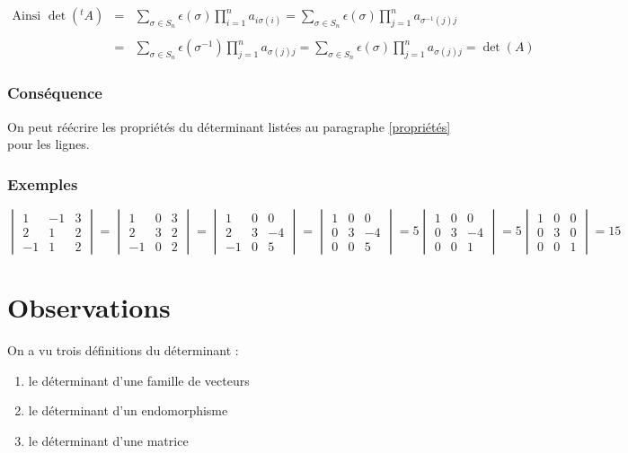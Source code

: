 \documentclass[a4paper,10pt]{book} %
\begin{document}
$\begin{array}{rcl}\text{Ainsi } \det({}^tA)&=& \sum_{\sigma\in S_n}\epsilon(\sigma)\prod_{i=1}^na_{i\sigma(i)}
=\sum_{\sigma\in S_n}\epsilon(\sigma)\prod_{j=1}^na_{\sigma^{-1}(j)j}\\\\
&=&\sum_{\sigma\in S_n}\epsilon(\sigma^{-1})\prod_{j=1}^na_{\sigma(j)j}
=\sum_{\sigma\in S_n}\epsilon(\sigma)\prod_{j=1}^na_{\sigma(j)j}=\det(A)\end{array}$

\subsubsection{Conséquence}
On peut réécrire les propriétés du déterminant listées au paragraphe \ref{propriétés} pour les lignes.

\subsubsection{Exemples}
$\begin{vmatrix}
1&-1&3\\2&1&2\\-1&1&2
\end{vmatrix}=\begin{vmatrix}
1&0&3\\2&3&2\\-1&0&2
\end{vmatrix}=\begin{vmatrix}
1&0&0\\2&3&-4\\-1&0&5
\end{vmatrix}=\begin{vmatrix}
1&0&0\\0&3&-4\\0&0&5
\end{vmatrix}=5\begin{vmatrix}
1&0&0\\0&3&-4\\0&0&1
\end{vmatrix}=5\begin{vmatrix}
1&0&0\\0&3&0\\0&0&1
\end{vmatrix}=15$

\section*{Observations}
On a vu trois définitions du déterminant :
\begin{enumerate}
\item le déterminant d'une famille de vecteurs
\item le déterminant d'un endomorphisme
\item le déterminant d'une matrice
\end{enumerate}
\end{document}
